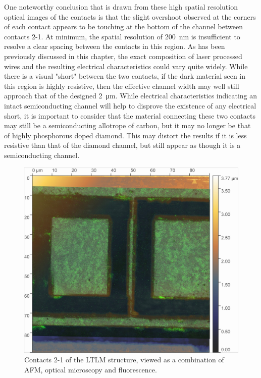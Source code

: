 \begin{refsection}
One noteworthy conclusion that is drawn from these high spatial resolution optical images of the contacts is that the slight overshoot observed at the corners of each contact appears to be touching at the bottom of the channel between contacts 2-1. At minimum, the spatial resolution of 200~\si{\nano\metre} is insufficient to resolve a clear spacing between the contacts in this region. As has been previously discussed in this chapter, the exact composition of laser processed wires and the resulting electrical characteristics could vary quite widely. While there is a visual "short" between the two contacts, if the dark material seen in this region is highly resistive, then the effective channel width may well still approach that of the designed 2~\si{\micro\metre}. While electrical characteristics indicating an intact semiconducting channel will help to disprove the existence of any electrical short, it is important to consider that the material connecting these two contacts may still be a semiconducting allotrope of carbon, but it may no longer be that of highly phosphorous doped diamond. This may distort the results if it is less resistive than that of the diamond channel, but still appear as though it is a semiconducting channel.

\begin{figure}[H]
    \centering
    \includegraphics[width=\linewidth]{Chapter7/Figs/Raster/21_comparison.jpg}
    \caption{Contacts 2-1 of the LTLM structure, viewed as a combination of AFM, optical microscopy and fluorescence.}
    \label{fig:21_comparison}
\end{figure}


\end{refsection}
